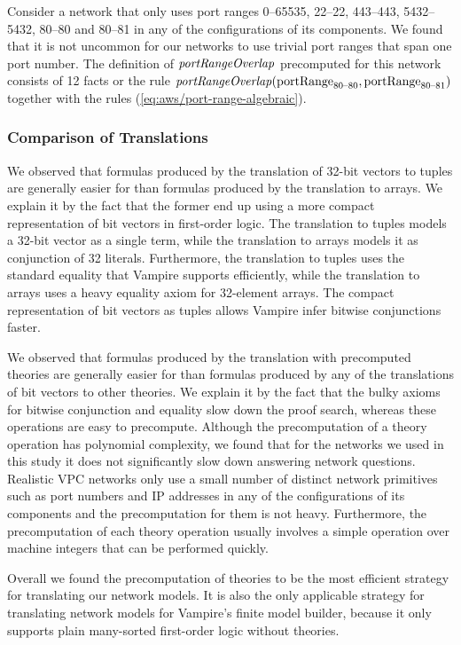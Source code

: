 Consider a network that only uses port ranges 0--65535, 22--22, 443--443, 5432--5432, 80--80 and 80--81 in any of the configurations of its components. We found that it is not uncommon for our networks to use trivial port ranges that span one port number. The definition of $\mathit{portRangeOverlap}$ precomputed for this network consists of 12 facts or the rule $\mathit{portRangeOverlap}(\mathrm{portRange}_\text{80--80},\mathrm{portRange}_\text{80--81})$ together with the rules (\ref{eq:aws/port-range-algebraic}).

\subsubsection*{Comparison of Translations}
We observed that formulas produced by the translation of 32-bit vectors to tuples are generally easier for \vampire than formulas produced by the translation to arrays. We explain it by the fact that the former end up using a more compact representation of bit vectors in first-order logic. The translation to tuples models a 32-bit vector as a single term, while the translation to arrays models it as conjunction of 32 literals. Furthermore, the translation to tuples uses the standard equality that Vampire supports efficiently, while the translation to arrays uses a heavy equality axiom for 32-element arrays. The compact representation of bit vectors as tuples allows Vampire infer bitwise conjunctions faster.

We observed that formulas produced by the translation with precomputed theories are generally easier for \vampire than formulas produced by any of the translations of bit vectors to other theories. We explain it by the fact that the bulky axioms for bitwise conjunction and equality slow down the proof search, whereas these operations are easy to precompute. Although the precomputation of a theory operation has polynomial complexity, we found that for the networks we used in this study it does not significantly slow down answering network questions. Realistic VPC networks only use a small number of distinct network primitives such as port numbers and IP addresses in any of the configurations of its components and the precomputation for them is not heavy. Furthermore, the precomputation of each theory operation usually involves a simple operation over machine integers that can be performed quickly.

Overall we found the precomputation of theories to be the most efficient strategy for translating our network models. It is also the only applicable strategy for translating network models for Vampire's finite model builder, because it only supports plain many-sorted first-order logic without theories.

